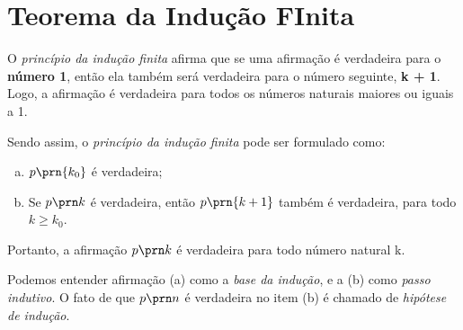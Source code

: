 \section{Teorema da Indução FInita}

O \emph{princípio da indução finita} afirma que se uma afirmação é verdadeira para o \textbf{número 1}, então ela também será verdadeira para o número seguinte, \textbf{k + 1}. Logo, a afirmação é verdadeira para todos os números naturais maiores ou iguais a 1. 

Sendo assim, o \emph{princípio da indução finita} pode ser formulado como:

\begin{enumerate}[(a)]
    \item $p \prn{k_0}$ é verdadeira;
    \item Se $p \prn k$ é verdadeira, então $p \prn {k+1}$ também
    é verdadeira, para todo $k \geq k_0$.
\end{enumerate}
  
Portanto, a afirmação $p \prn k$ é verdadeira para todo número natural k.

\begin{remark}
    Podemos entender afirmação (a) como a \emph{base da indução}, e a (b) como \emph{passo indutivo}. O fato de que $p \prn n$ é verdadeira no item (b) é chamado de \emph{hipótese de indução}.
\end{remark}

